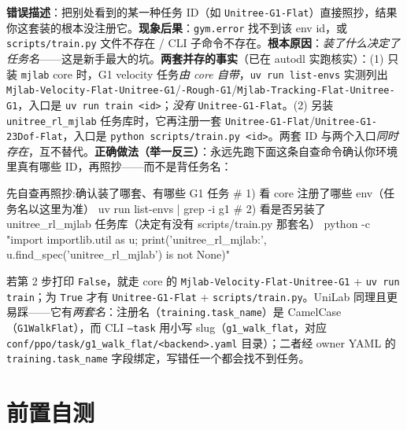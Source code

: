 \begin{pitfall}
\textbf{错误描述}：把别处看到的某一种任务 ID（如 \texttt{Unitree-G1-Flat}）直接照抄，结果你这套装的根本没注册它。\textbf{现象后果}：\verb|gym.error| 找不到该 env id，或 \texttt{scripts/\allowbreak train.\allowbreak py} 文件不存在 / CLI 子命令不存在。\textbf{根本原因}：\emph{装了什么决定了任务名}——这是新手最大的坑。\textbf{两套并存的事实}（已在 autodl 实跑核实）：\;(1) 只装 \texttt{mjlab} core 时，G1 velocity 任务\emph{由 core 自带}，\texttt{uv run list-envs} 实测列出 \texttt{Mjlab-Velocity-Flat-Unitree-G1}/\allowbreak\texttt{-Rough-G1}/\allowbreak\texttt{Mjlab-Tracking-Flat-Unitree-G1}，入口是 \texttt{uv run train <id>}；\emph{没有} \texttt{Unitree-G1-Flat}。\;(2) 另装 \texttt{unitree\_rl\_mjlab} 任务库时，它再注册一套 \texttt{Unitree-G1-Flat}/\allowbreak\texttt{Unitree-G1-23Dof-Flat}，入口是 \texttt{python scripts/\allowbreak train.\allowbreak py <id>}。两套 ID 与两个入口\emph{同时存在}，互不替代。\textbf{正确做法（举一反三）}：永远先跑下面这条自查命令确认你环境里真有哪些 ID，再照抄——而不是背任务名：
\begin{codebox}[bash]{先自查再照抄:确认装了哪套、有哪些 G1 任务}
# 1) 看 core 注册了哪些 env（任务名以这里为准）
uv run list-envs | grep -i g1
# 2) 看是否另装了 unitree_rl_mjlab 任务库（决定有没有 scripts/train.py 那套名）
python -c "import importlib.util as u; print('unitree_rl_mjlab:', u.find_spec('unitree_rl_mjlab') is not None)"
\end{codebox}
若第 2 步打印 \texttt{False}，就走 core 的 \texttt{Mjlab-Velocity-Flat-Unitree-G1} + \texttt{uv run train}；为 \texttt{True} 才有 \texttt{Unitree-G1-Flat} + \texttt{scripts/\allowbreak train.\allowbreak py}。\;UniLab 同理且更易踩——它有\emph{两套名}：注册名（\texttt{training.\allowbreak task\_name}）是 CamelCase（\texttt{G1WalkFlat}），而 CLI \texttt{--task} 用小写 slug（\texttt{g1\_walk\_flat}，对应 \texttt{conf/\allowbreak ppo/\allowbreak task/\allowbreak g1\_walk\_flat/\allowbreak <backend>.\allowbreak yaml} 目录）；二者经 owner YAML 的 \texttt{training.\allowbreak task\_name} 字段绑定，写错任一个都会找不到任务。
\end{pitfall}

\section*{前置自测}

